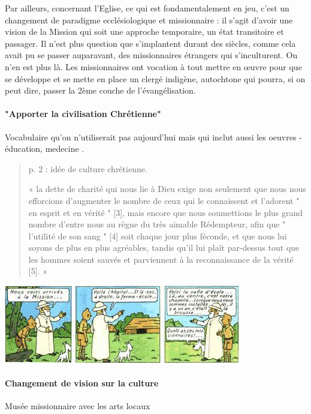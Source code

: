 Par ailleurs, concernant l’Eglise, ce qui est fondamentalement en jeu, c’est un changement de paradigme ecclésiologique et missionnaire : il s’agit d’avoir une vision de la Mission qui soit une approche temporaire, un état transitoire et passager. Il n’est plus question que s’implantent durant des siècles, comme cela avait pu se passer auparavant, des missionnaires étrangers qui s’inculturent. On n’en est plus là. Les missionnaires ont vocation à tout mettre en œuvre pour que se développe et se mette en place un clergé indigène, autochtone qui pourra, si on peut dire, passer la 2ème couche de l’évangélisation.
\paragraph{"Apporter la civilisation Chrétienne"} Vocabulaire qu'on n'utiliserait pas aujourd'hui mais qui inclut aussi les oeuvres - éducation, medecine .   

\begin{quote}
   
 p. 2 : idée de culture chrétienne.

« la dette de charité qui nous lie à Dieu exige non seulement que nous nous efforcions d'augmenter le nombre de ceux qui le connaissent et l'adorent " en esprit et en vérité " [3], mais encore que nous soumettions le plus grand nombre d'entre nous au règne du très aimable Rédempteur, afin que " l'utilité de son sang " [4] soit chaque jour plus féconde, et que nous lui soyons de plus en plus agréables, tandis qu'il lui plaît par-dessus tout que les hommes soient sauvés et parviennent à la reconnaissance de la vérité [5]. »

\end{quote}
\includegraphics[width=\textwidth]{SeminaireMission/images/TintinCongo2.jpg}

\paragraph{Changement de vision sur la culture} Musée missionnaire avec les arts locaux
